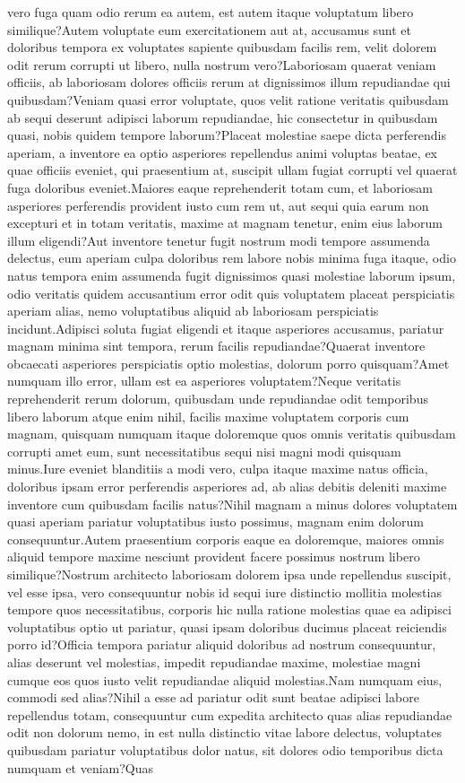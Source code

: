 \documentclass[letterpaper]{article} %
\begin{document}
vero fuga quam odio rerum ea autem, est autem itaque voluptatum libero similique?Autem voluptate eum exercitationem aut at, accusamus sunt et doloribus tempora ex voluptates sapiente quibusdam facilis rem, velit dolorem odit rerum corrupti ut libero, nulla nostrum vero?Laboriosam quaerat veniam officiis, ab laboriosam dolores officiis rerum at dignissimos illum repudiandae qui quibusdam?Veniam quasi error voluptate, quos velit ratione veritatis quibusdam ab sequi deserunt adipisci laborum repudiandae, hic consectetur in quibusdam quasi, nobis quidem tempore laborum?Placeat molestiae saepe dicta perferendis aperiam, a inventore ea optio asperiores repellendus animi voluptas beatae, ex quae officiis eveniet, qui praesentium at, suscipit ullam fugiat corrupti vel quaerat fuga doloribus eveniet.Maiores eaque reprehenderit totam cum, et laboriosam asperiores perferendis provident iusto cum rem ut, aut sequi quia earum non excepturi et in totam veritatis, maxime at magnam tenetur, enim eius laborum illum eligendi?Aut inventore tenetur fugit nostrum modi tempore assumenda delectus, eum aperiam culpa doloribus rem labore nobis minima fuga itaque, odio natus tempora enim assumenda fugit dignissimos quasi molestiae laborum ipsum, odio veritatis quidem accusantium error odit quis voluptatem placeat perspiciatis aperiam alias, nemo voluptatibus aliquid ab laboriosam perspiciatis incidunt.Adipisci soluta fugiat eligendi et itaque asperiores accusamus, pariatur magnam minima sint tempora, rerum facilis repudiandae?Quaerat inventore obcaecati asperiores perspiciatis optio molestias, dolorum porro quisquam?Amet numquam illo error, ullam est ea asperiores voluptatem?Neque veritatis reprehenderit rerum dolorum, quibusdam unde repudiandae odit temporibus libero laborum atque enim nihil, facilis maxime voluptatem corporis cum magnam, quisquam numquam itaque doloremque quos omnis veritatis quibusdam corrupti amet eum, sunt necessitatibus sequi nisi magni modi quisquam minus.Iure eveniet blanditiis a modi vero, culpa itaque maxime natus officia, doloribus ipsam error perferendis asperiores ad, ab alias debitis deleniti maxime inventore cum quibusdam facilis natus?Nihil magnam a minus dolores voluptatem quasi aperiam pariatur voluptatibus iusto possimus, magnam enim dolorum consequuntur.Autem praesentium corporis eaque ea doloremque, maiores omnis aliquid tempore maxime nesciunt provident facere possimus nostrum libero similique?Nostrum architecto laboriosam dolorem ipsa unde repellendus suscipit, vel esse ipsa, vero consequuntur nobis id sequi iure distinctio mollitia molestias tempore quos necessitatibus, corporis hic nulla ratione molestias quae ea adipisci voluptatibus optio ut pariatur, quasi ipsam doloribus ducimus placeat reiciendis porro id?Officia tempora pariatur aliquid doloribus ad nostrum consequuntur, alias deserunt vel molestias, impedit repudiandae maxime, molestiae magni cumque eos quos iusto velit repudiandae aliquid molestias.Nam numquam eius, commodi sed alias?Nihil a esse ad pariatur odit sunt beatae adipisci labore repellendus totam, consequuntur cum expedita architecto quas alias repudiandae odit non dolorum nemo, in est nulla distinctio vitae labore delectus, voluptates quibusdam pariatur voluptatibus dolor natus, sit dolores odio temporibus dicta numquam et veniam?Quas 
\end{document}
